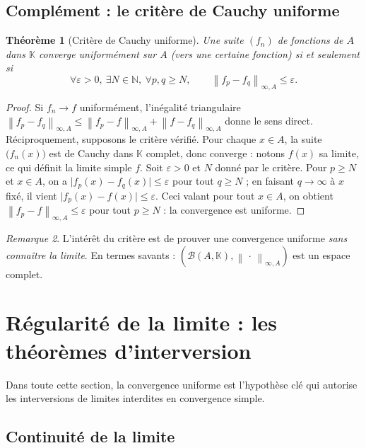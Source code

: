 \documentclass[11pt,a4paper]{article}
\theoremstyle{plain}
\newtheorem{theoreme}{Théorème}[section]
\theoremstyle{definition}
\theoremstyle{remark}
\newtheorem{remarque}[theoreme]{Remarque}
\newcommand{\N}{\mathbb{N}}
\newcommand{\K}{\mathbb{K}}
\newcommand{\eps}{\varepsilon}
\newcommand{\Ninf}[2]{\left\lVert #1 \right\rVert_{\infty,#2}}
\numberwithin{equation}{section}
\begin{document}
\subsection{Complément : le critère de Cauchy uniforme}

\begin{theoreme}[Critère de Cauchy uniforme]\label{thm:cauchy}
Une suite $(f_n)$ de fonctions de $A$ dans $\K$ converge uniformément sur
$A$ (vers une certaine fonction) si et seulement si
\[
    \forall\eps>0,\ \exists N\in\N,\ \forall p,q\geq N,
    \qquad \Ninf{f_p-f_q}{A}\leq \eps .
\]
\end{theoreme}

\begin{proof}
Si $f_n\to f$ uniformément, l'inégalité triangulaire
$\Ninf{f_p-f_q}{A}\leq\Ninf{f_p-f}{A}+\Ninf{f-f_q}{A}$ donne le sens direct.
Réciproquement, supposons le critère vérifié. Pour chaque $x\in A$, la suite
$\bigl(f_n(x)\bigr)$ est de Cauchy dans $\K$ complet, donc converge : notons
$f(x)$ sa limite, ce qui définit la limite simple $f$. Soit $\eps>0$ et $N$
donné par le critère. Pour $p\geq N$ et $x\in A$, on a
$\lvert f_p(x)-f_q(x)\rvert\leq\eps$ pour tout $q\geq N$ ; en faisant
$q\to\infty$ à $x$ fixé, il vient $\lvert f_p(x)-f(x)\rvert\leq\eps$. Ceci
valant pour tout $x\in A$, on obtient $\Ninf{f_p-f}{A}\leq\eps$ pour tout
$p\geq N$ : la convergence est uniforme.
\end{proof}

\begin{remarque}
L'intérêt du critère est de prouver une convergence uniforme \emph{sans
connaître la limite}. En termes savants : $(\mathcal{B}(A,\K),
\Ninf{\,\cdot\,}{A})$ est un espace complet.
\end{remarque}

\section{Régularité de la limite : les théorèmes d'interversion}

Dans toute cette section, la convergence uniforme est l'hypothèse clé qui
autorise les interversions de limites interdites en convergence simple.

\subsection{Continuité de la limite}
\end{document}
